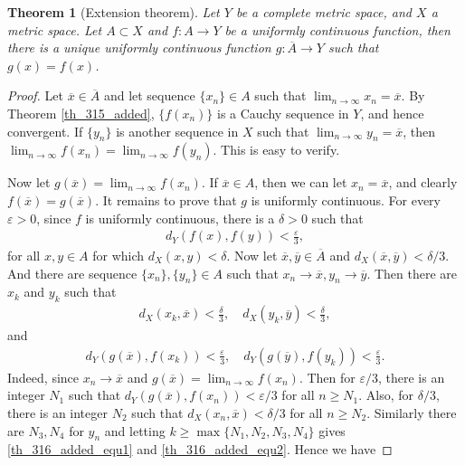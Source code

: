 \documentclass[11pt]{book}
\newtheorem{theorem}{Theorem}[chapter]
\theoremstyle{definition}
\numberwithin{equation}{chapter}
\begin{document}
\begin{theorem}[Extension theorem]\label{th_316_added}
Let $Y$ be a complete metric space, and $X$ a metric space. Let $A \subset X$ and $f: A \to Y$ be a uniformly continuous function, then there is a unique uniformly continuous function $g: \overline{A} \to Y$ such that $g(x) = f(x)$.
\end{theorem}
\begin{proof}
Let $\overline{x} \in \overline{A}$ and let sequence $\{x_n\} \in A$ such that $\lim_{n\to\infty} x_n = \overline{x}$. By Theorem \ref{th_315_added}, $\{f(x_n)\}$ is a Cauchy sequence in $Y$, and hence convergent. If $\{y_n\}$ is another sequence in $X$ such that $\lim_{n\to\infty} y_n = \overline{x}$, then $\lim_{n\to\infty} f(x_n) = \lim_{n\to\infty} f(y_n)$. This is easy to verify.

Now let $g(\overline{x}) = \lim_{n\to\infty} f(x_n)$. If $\overline{x} \in A$, then we can let $x_n = \overline{x}$, and clearly $f(\overline{x}) = g(\overline{x})$. It remains to prove that $g$ is uniformly continuous. For every $\varepsilon > 0$, since $f$ is uniformly continuous, there is a $\delta > 0$ such that 
\begin{align*}
    d_Y(f(x),f(y)) < \frac{\varepsilon}{3},
\end{align*}
for all $x,y \in A$ for which $d_X(x,y) < \delta$. Now let $\overline{x}, \overline{y} \in \overline{A}$ and $d_X(\overline{x}, \overline{y}) < \delta/3$. And there are sequence $\{x_n\}, \{y_n\} \in A$ such that $x_n \to \overline{x}, y_n \to \overline{y}$. Then there are $x_k$ and $y_k$ such that
\begin{align}\label{th_316_added_equ1}
    d_X(x_k,\overline{x}) < \frac{\delta}{3}, \quad d_X(y_k,\overline{y}) < \frac{\delta}{3}, 
\end{align}
and 
\begin{align}\label{th_316_added_equ2}
    d_Y(g(\overline{x}),f(x_k)) < \frac{\varepsilon}{3}, \quad d_Y(g(\overline{y}),f(y_k)) < \frac{\varepsilon}{3}.
\end{align}
Indeed, since $x_n \to \overline{x}$ and $g(\overline{x}) = \lim_{n\to\infty} f(x_n)$. Then for $\varepsilon/3$, there is an integer $N_1$ such that $d_Y(g(\overline{x}), f(x_n)) < \varepsilon/3$ for all $n \geq N_1$. Also, for $\delta/3$, there is an integer $N_2$ such that $d_X(x_n, \overline{x}) < \delta/3$ for all $n \geq N_2$. Similarly there are $N_3, N_4$ for $y_n$ and letting $k \geq \max\{N_1, N_2, N_3, N_4\}$ gives \eqref{th_316_added_equ1} and \eqref{th_316_added_equ2}. Hence we have

\end{proof}
\end{document}
